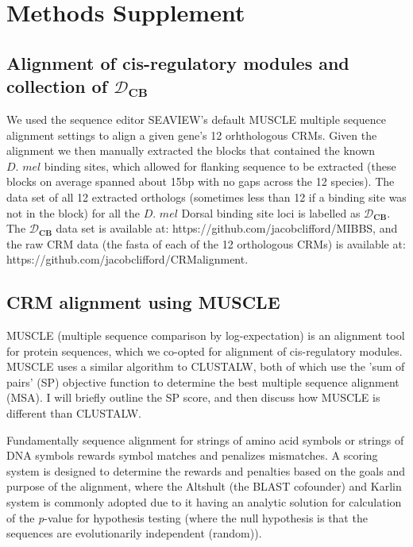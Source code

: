 \section{Methods Supplement}


\subsection{Alignment of cis-regulatory modules and collection of $\mathcal D_{\textbf{CB}}$} \label{muscle}
	We used the sequence editor SEAVIEW's default MUSCLE multiple sequence alignment settings \cite{pmid9021275} to align a given gene's 12 orhthologous CRMs\cite{BSA}.  Given the alignment we then manually extracted the blocks that contained the known $\textit{D. mel}$ binding sites, which allowed for flanking sequence to be extracted (these blocks on average spanned about 15bp with no gaps across the 12 species).  The data set of all 12 extracted orthologs (sometimes less than 12 if a binding site was not in the block) for all the $\textit{D. mel}$ Dorsal binding site loci is labelled as $\mathcal D_{\textbf{CB}}$.  The $\mathcal D_{\textbf{CB}}$ data set is available at: https://github.com/jacobclifford/MIBBS, and the raw CRM data (the fasta of each of the 12 orthologous CRMs) is available at:  https://github.com/jacobclifford/CRMalignment.
	
\subsection{CRM alignment using MUSCLE}
MUSCLE (multiple sequence comparison by log-expectation) is an alignment tool for protein sequences, which we co-opted for alignment of cis-regulatory modules.  MUSCLE uses a similar algorithm to CLUSTALW, both of which use the 'sum of pairs' (SP) objective function to determine the best multiple sequence alignment (MSA).  I will briefly outline the SP score, and then discuss how MUSCLE is different than CLUSTALW. 

  Fundamentally sequence alignment for strings of amino acid symbols or strings of DNA symbols rewards symbol matches and penalizes mismatches.  A scoring system is designed to determine the rewards and penalties based on the goals and purpose of the alignment, where the Altshult (the BLAST cofounder) and Karlin system is commonly adopted due to it having an analytic solution for calculation of the \textit{p}-value for hypothesis testing (where the null hypothesis is that the sequences are evolutionarily independent (random)).  

